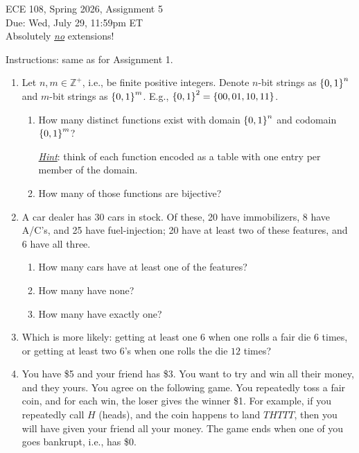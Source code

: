 \documentclass[11pt,onecolumn]{article}
\newcommand{\set}[1]{\ensuremath{\left\{#1\right\}}\xspace}
\let\originalleft\left
\let\originalright\right
\renewcommand{\left}{\mathopen{}\mathclose\bgroup\originalleft}
\renewcommand{\right}{\aftergroup\egroup\originalright}
\begin{document}
\pagestyle{empty}

\renewcommand{\ULthickness}{1.4pt}

\begin{center}
\begin{large}
ECE 108, Spring 2026, Assignment 5\\
Due: Wed, July 29, 11:59pm ET\\
Absolutely \emph{\underline{no}} extensions!
\end{large}
\end{center}

\vspace*{0.125in}\noindent
Instructions: same as for Assignment 1.

\begin{enumerate}
\item Let $n,m \in\mathbb{Z}^+$, i.e., be finite positive integers. Denote $n$-bit strings as $\set{0,1}^n$ and $m$-bit strings as $\set{0,1}^m$. E.g., $\set{0,1}^2 = \set{00, 01, 10, 11}$. 
\begin{enumerate}
\item How many distinct functions exist with domain $\set{0,1}^n$ and codomain $\set{0,1}^m$?

\underline{\emph{Hint}}: think of each function encoded as a table with one entry per member of the domain.

\item How many of those functions are bijective?
\end{enumerate}

\item A car dealer has 30 cars in stock. Of these, 20 have immobilizers, 8 have A/C’s, and 25 have fuel-injection; 20 have at least two of these features, and 6 have all three.
\begin{enumerate}
\item How many cars have at least one of the features?
\item How many have none?
\item How many have exactly one?
\end{enumerate}

\item Which is more likely: getting at least one $6$ when one rolls a fair die $6$ times, or getting at least two $6$'s when one rolls the die $12$ times?

\item You have \$5 and your friend has \$3. You want to try and win all their money, and they yours. You agree on the following game. You repeatedly toss a fair coin, and for each win, the loser gives the winner \$1. For example, if you repeatedly call $H$ (heads), and the coin happens to land $THTTT$, then you will have given your friend all your money. The game ends when one of you goes bankrupt, i.e., has \$0.


\end{enumerate}
\end{document}
